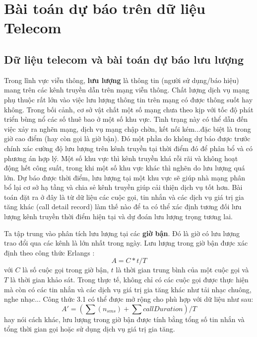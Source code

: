 \chapter{Bài toán dự báo trên dữ liệu Telecom}
\ifpdf
    \graphicspath{{3_experiment/figures/PNG/}{3_experiment/figures/PDF/}{3_experiment/figures/}}
\else
    \graphicspath{{3_experiment/figures/EPS/}{3_experiment/figures/}}
\fi

\section{Dữ liệu telecom và bài toán dự báo lưu lượng}
Trong lĩnh vực viễn thông, \textbf{lưu lượng} là thông tin (người sử dụng/báo hiệu) mang trên các kênh truyền dẫn trên mạng viễn thông. Chất lượng dịch vụ mạng phụ thuộc rất lớn vào việc lưu lượng thông tin trên mạng có được thông suốt hay không. Trong bối cảnh, cơ sở vật chất một số mạng chưa theo kịp với tốc độ phát triển bùng nổ các số thuê bao ở một số khu vực. Tình trạng này có thể dẫn đến việc xảy ra nghẽn mạng, dịch vụ mạng chập chờn, kết nối kém...đặc biệt là trong giờ cao điểm (hay còn gọi là giờ bận). Đó một phần do không dự báo được trước chính xác cường độ lưu lượng trên kênh truyền tại thời điểm đó để phân bổ và có phương án hợp lý. Một số khu vực thì kênh truyền khá rỗi rãi và không hoạt động hết công suất, trong khi một số khu vực khác thì nghẽn do lưu lượng quá lớn. Dự báo được thời điểm, lưu lượng tại một khu vực sẽ giúp nhà mạng phân bổ lại cơ sở hạ tầng và chia sẻ kênh truyền giúp cải thiện dịch vụ tốt hơn. Bài toán đặt ra ở đây là từ dữ liệu các cuộc gọi, tin nhắn và các dịch vụ giá trị gia tăng khác (call detail record) làm thế nào để ta có thể xác định tương đối lưu lượng kênh truyền thời điểm hiện tại và dự đoán lưu lượng trọng tương lai. 

Ta tập trung vào phân tích lưu lượng tại các \textbf{giờ bận}. Đó là giờ có lưu lượng trao đổi qua các kênh là lớn nhất trong ngày. Lưu lượng trong giờ bận được xác định theo công thức Erlangs \citep{flo95}:
\begin{equation}
A = C*t / T
\end{equation}
với $C$ là số cuộc gọi trong giờ bận, $t$ là thời gian trung bình của một cuộc gọi và $T$ là thời gian khảo sát. 
Trong thực tế, không chỉ có các cuộc gọi được thực hiện mà còn có các tin nhắn và các dịch vụ giá trị gia tăng khác như tải nhạc chuông, nghe nhạc... Công thức 3.1 có thể được mở rộng cho phù hợp với dữ liệu như sau:
\begin{equation}
A' = (\sum\limits(n_{sms}) + \sum\limits{callDuration})/T
\end{equation}
hay nói cách khác, lưu lượng trong giờ bận được tính bằng tổng số tin nhắn và tổng thời gian gọi hoặc sử dụng dịch vụ giá trị gia tăng.


